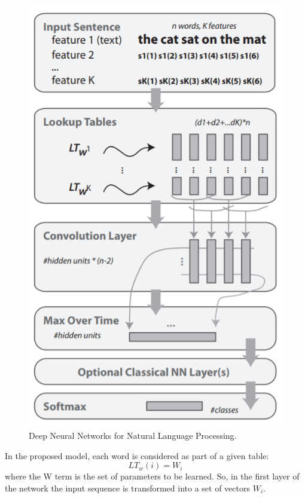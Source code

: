 \documentclass[a4paper,12pt]{report}
\begin{document}
	\begin{figure}[H]
		\centering
		\includegraphics[scale=0.4]{unified}
		\caption{Deep Neural Networks for Natural Language Processing\cite{unified}.}
	\end{figure}
	In the proposed model, each word is considered as part of a given table:
	\begin{equation}
	LT_w(i) = W_i
	\end{equation}
	where the W term is the set of parameters to be learned. So, in the first layer of the network the input sequence is transformed into a set of vectors ${W_i}$.\\\\
\end{document}
